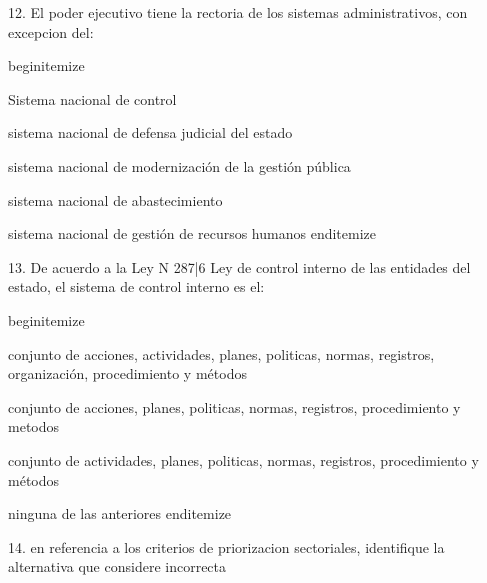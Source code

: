 12.  El poder ejecutivo tiene la rectoria de los sistemas administrativos, con excepcion del:

begin{itemize}
			\item Sistema nacional de control 
 			\item sistema nacional de defensa judicial del estado
			\item sistema nacional de modernización de la gestión pública 
			\item sistema nacional de abastecimiento 
			\item sistema nacional de gestión de recursos humanos 
end{itemize}

13. De acuerdo a la Ley N 287|6 Ley de control interno de las entidades del estado, el sistema de control interno es el:

begin{itemize}
			\item conjunto de acciones, actividades, planes, politicas, normas, registros, organización, procedimiento y métodos 
 			\item conjunto de acciones, planes, politicas, normas, registros, procedimiento y metodos
			\item conjunto de actividades, planes, politicas, normas, registros, procedimiento y métodos 
			\item ninguna de las anteriores 
end{itemize}

14. en referencia a los criterios de priorizacion sectoriales, identifique la alternativa que considere incorrecta 

